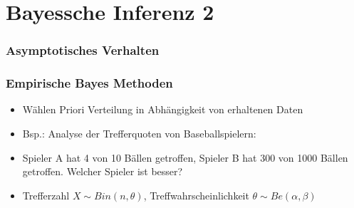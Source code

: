 \documentclass[aspectratio=169,xcolor=dvipsnames]{beamer}
\begin{document}
\section{Bayessche Inferenz 2}
\begin{frame}
\frametitle{Asymptotisches Verhalten}
\end{frame}

\begin{frame}
\frametitle{Empirische Bayes Methoden}
\begin{itemize}
	\item<1-> Wählen Priori Verteilung in Abhängigkeit von erhaltenen Daten
	\item<2-> Bsp.: Analyse der Trefferquoten von Baseballspielern:
	\item<3-> Spieler A hat 4 von 10 Bällen getroffen, Spieler B hat 300 von 1000 Bällen getroffen. Welcher Spieler ist besser?
	\item<4-> Trefferzahl $X\sim Bin(n,\theta)$, Treffwahrscheinlichkeit $\theta\sim Be(\alpha,\beta)$
\end{itemize}
\end{frame}
\end{document}
